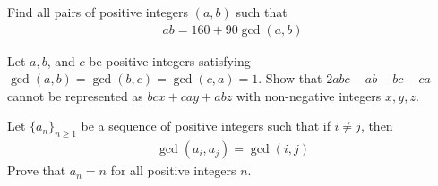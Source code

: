 \documentclass{subfile}
\begin{document}
	\begin{problem}
		Find all pairs of positive integers $(a, b)$ such that
			\begin{align*}
				ab=160 + 90 \gcd(a,b)
			\end{align*}
	\end{problem}


	\begin{problem}
		Let $a, b$, and $c$ be positive integers satisfying $\gcd (a, b) = \gcd (b, c) = \gcd (c, a) = 1$. Show that $2abc-ab-bc-ca$ cannot be represented as $bcx+cay +abz$ with non-negative integers $x, y, z$. %
	\end{problem}


	\begin{problem}
		Let $\{a_n\}_{n\geq 1}$ be a sequence of positive integers such that if $i \neq j$, then
			\begin{align*}
				\gcd(a_i,a_j)=\gcd(i,j)
			\end{align*}
		Prove that $a_n=n$ for all positive integers $n$. %
	\end{problem}

\end{document}
